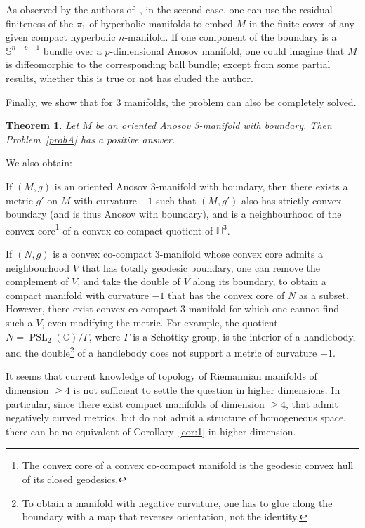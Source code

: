 \documentclass[10pt]{amsart}
\newtheorem{theo}{Theorem}[section]
\theoremstyle{definition}\newtheorem{defi}[theo]{Definition}\newtheorem{rema}[theo]{Remark}\newtheorem{exam}[theo]{Example}\newtheorem{exem}[theo]{Example}\newtheorem{nota}[theo]{Notation}
\newcommand{\Ss}{\mathbb{S}}
\newcommand{\C}{\mathbb{C}}
\newcommand{\Hh}{\mathbb{H}}
\DeclareMathOperator{\PSL}{PSL}
\theoremstyle{plain}
\begin{document}
As observed by the authors of~\cite{Chen-Erchenko-Gogolev}, in the second case, one can use the residual finiteness of the $\pi_1$ of hyperbolic manifolds to embed $M$ in the finite cover of any given compact hyperbolic $n$-manifold. If one component of the boundary is a $\Ss^{n-p-1}$ bundle over a $p$-dimensional Anosov manifold, one could imagine that $M$ is diffeomorphic to the corresponding ball bundle; except from some partial results, whether this is true or not has eluded the author.

Finally, we show that for 3 manifolds, the problem can also be completely solved.


\begin{theo}\label{thm:3D}
Let $M$ be an oriented Anosov 3-manifold with boundary. Then Problem~\ref{probA} has a positive answer.
\end{theo}


We also obtain:
\begin{coro}\label{cor:1}
If $(M,g)$ is an oriented Anosov 3-manifold with boundary, then there exists a metric $g'$ on $M$ with curvature $-1$ such that $(M,g')$ also has strictly convex boundary (and is thus Anosov with boundary), and is a neighbourhood of the convex core\footnote{The convex core of a convex co-compact manifold is the geodesic convex hull of its closed geodesics.} of a convex co-compact quotient of $\Hh^3$.
\end{coro}

If $(N,g)$ is a convex co-compact 3-manifold whose convex core admits a neighbourhood $V$ that has totally geodesic boundary, one can remove the complement of $V$, and take the double of $V$ along its boundary, to obtain a compact manifold with curvature $-1$ that has the convex core of $N$ as a subset. However, there exist convex co-compact 3-manifold for which one cannot find such a $V$, even modifying the metric. For example, the quotient $N=\PSL_2(\C)/\Gamma$, where $\Gamma$ is a Schottky group, is the interior of a handlebody, and the double\footnote{To obtain a manifold with negative curvature, one has to glue along the boundary with a map that reverses orientation, not the identity.} of a handlebody does not support a metric of curvature $-1$.

It seems that current knowledge of topology of Riemannian manifolds of dimension $\geq 4$ is not sufficient to settle the question in higher dimensions. In particular, since there exist compact manifolds of dimension $\geq 4$, that admit negatively curved metrics, but do not admit a structure of homogeneous space, there can be no equivalent of Corollary~\ref{cor:1} in higher dimension.
\end{document}
